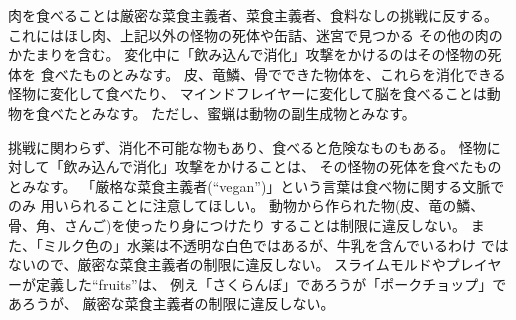 肉を食べることは厳密な菜食主義者、菜食主義者、食料なしの挑戦に反する。
これにはほし肉、上記以外の怪物の死体や缶詰、迷宮で見つかる
その他の肉のかたまりを含む。
変化中に「飲み込んで消化」攻撃をかけるのはその怪物の死体を
食べたものとみなす。
皮、竜鱗、骨でできた物体を、これらを消化できる怪物に変化して食べたり、
マインドフレイヤーに変化して脳を食べることは動物を食べたとみなす。
ただし、蜜蝋は動物の副生成物とみなす。

挑戦に関わらず、消化不可能な物もあり、食べると危険なものもある。
怪物に対して「飲み込んで消化」攻撃をかけることは、
その怪物の死体を食べたものとみなす。
「厳格な菜食主義者(``vegan'')」という言葉は食べ物に関する文脈でのみ
用いられることに注意してほしい。
動物から作られた物(皮、竜の鱗、骨、角、さんご)を使ったり身につけたり
することは制限に違反しない。
また、「ミルク色の」水薬は不透明な白色ではあるが、牛乳を含んでいるわけ
ではないので、厳密な菜食主義者の制限に違反しない。
スライムモルドやプレイヤーが定義した``fruits''は、
例え「さくらんぼ」であろうが「ポークチョップ」であろうが、
厳密な菜食主義者の制限に違反しない。

